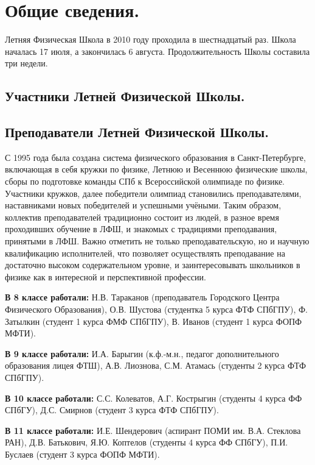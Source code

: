 \documentclass[12pt,a4paper,oneside]{scrartcl}
\begin{document}
\section{Общие сведения.}
\label{sec:general}

Летняя Физическая Школа в 2010 году проходила в шестнадцатый
раз. Школа началась 17 июля, а закончилась 6
августа. Продолжительность Школы составила три недели. 

\subsection{Участники Летней Физической Школы. }
\label{sec:scholars}



\subsection{Преподаватели Летней Физической Школы. }
\label{sec:teachers}

С 1995 года была создана система физического образования в
Санкт-Петербурге, включающая в себя кружки по физике, Летнюю и
Весеннюю физические школы, сборы по подготовке команды СПб к
Всероссийской олимпиаде по физике. Участники кружков, далее победители
олимпиад становились преподавателями, наставниками новых победителей и
успешными учёными. Таким образом, коллектив преподавателей традиционно
состоит из людей, в разное время проходивших обучение в ЛФШ, и
знакомых с традициями преподавания, принятыми в ЛФШ. Важно отметить не
только преподавательскую, но и научную квалификацию исполнителей, что
позволяет осуществлять преподавание на достаточно высоком
содержательном уровне, и заинтересовывать школьников в физике как в
интересной и перспективной профессии.

\textbf{В 8 классе работали:} Н.В. Тараканов (преподаватель Городского Центра
Физического Образования), О.В. Шустова (студентка 5 курса ФТФ СПбГПУ),
Ф. Затылкин (студент 1 курса ФМФ СПбГПУ), В. Иванов (студент 1 курса
ФОПФ МФТИ).

\textbf{В 9 классе работали:} И.А. Барыгин (к.ф.-м.н., педагог дополнительного
образования лицея ФТШ), А.В. Лиознова, С.М. Атамась (студенты 2 курса
ФТФ СПбГПУ).

\textbf{В 10 классе работали:} С.С. Колеватов, А.Г. Кострыгин (студенты 4
курса ФФ СПбГУ), Д.С. Смирнов (студент 3 курса ФТФ СПбГПУ).

\textbf{В 11 классе работали:} И.Е. Шендерович (аспирант ПОМИ
им. В.А. Стеклова РАН), Д.В. Батькович, Я.Ю. Коптелов (студенты 4 курса
ФФ СПбГУ), П.И. Буслаев (студент 3 курса ФОПФ МФТИ).
\end{document}
